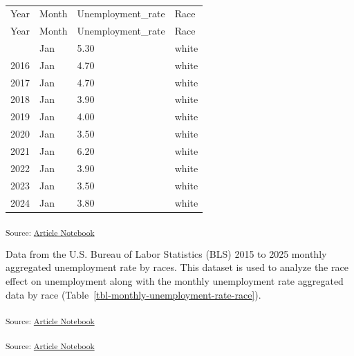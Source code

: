 \documentclass[
]{agujournal2019}
\begin{document}
\begin{longtable}[]{@{}llll@{}}

\caption{\label{tbl-monthly-unemployment-rate-race}BLS 2015-2025 Monthly
Unemployment Rate By Race}

\tabularnewline

\caption{}\label{T_bcf33}\tabularnewline
\toprule\noalign{}
Year & Month & Unemployment\_rate & Race \\
\midrule\noalign{}
\endfirsthead
\toprule\noalign{}
Year & Month & Unemployment\_rate & Race \\
\midrule\noalign{}
\endhead
\bottomrule\noalign{}
\endlastfoot
2015 & Jan & 5.30 & white \\
2016 & Jan & 4.70 & white \\
2017 & Jan & 4.70 & white \\
2018 & Jan & 3.90 & white \\
2019 & Jan & 4.00 & white \\
2020 & Jan & 3.50 & white \\
2021 & Jan & 6.20 & white \\
2022 & Jan & 3.90 & white \\
2023 & Jan & 3.50 & white \\
2024 & Jan & 3.80 & white \\

\end{longtable}

\textsubscript{Source:
\href{https://mw1296.github.io/dsan5650_social_causal_inference/index.qmd.html}{Article
Notebook}}

Data from the U.S. Bureau of Labor Statistics (BLS) 2015 to 2025 monthly
aggregated unemployment rate by races. This dataset is used to analyze
the race effect on unemployment along with the monthly unemployment rate
aggregated data by race
(Table~\ref{tbl-monthly-unemployment-rate-race}).

\textsubscript{Source:
\href{https://mw1296.github.io/dsan5650_social_causal_inference/index.qmd.html}{Article
Notebook}}

\textsubscript{Source:
\href{https://mw1296.github.io/dsan5650_social_causal_inference/index.qmd.html}{Article
Notebook}}
\end{document}
